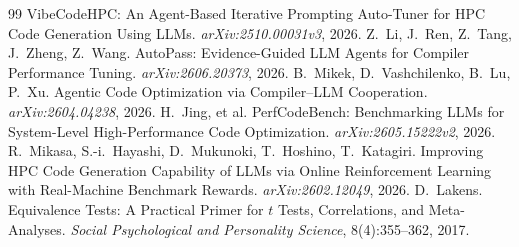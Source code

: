 \documentclass[conference,letterpaper]{IEEEtran}
\begin{document}
\begin{thebibliography}{99}
  VibeCodeHPC: An Agent-Based Iterative Prompting Auto-Tuner for HPC Code Generation Using LLMs.
  \textit{arXiv:2510.00031v3}, 2026.
 Z.~Li, J.~Ren, Z.~Tang, J.~Zheng, Z.~Wang.
  AutoPass: Evidence-Guided LLM Agents for Compiler Performance Tuning.
  \textit{arXiv:2606.20373}, 2026.
 B.~Mikek, D.~Vashchilenko, B.~Lu, P.~Xu.
  Agentic Code Optimization via Compiler--LLM Cooperation.
  \textit{arXiv:2604.04238}, 2026.
 H.~Jing, et al.
  PerfCodeBench: Benchmarking LLMs for System-Level High-Performance Code Optimization.
  \textit{arXiv:2605.15222v2}, 2026.
 R.~Mikasa, S.-i.~Hayashi, D.~Mukunoki, T.~Hoshino, T.~Katagiri.
  Improving HPC Code Generation Capability of LLMs via Online Reinforcement Learning
  with Real-Machine Benchmark Rewards.
  \textit{arXiv:2602.12049}, 2026.
 D.~Lakens.
  Equivalence Tests: A Practical Primer for $t$ Tests, Correlations, and Meta-Analyses.
  \textit{Social Psychological and Personality Science}, 8(4):355--362, 2017.
\end{thebibliography}
\end{document}
